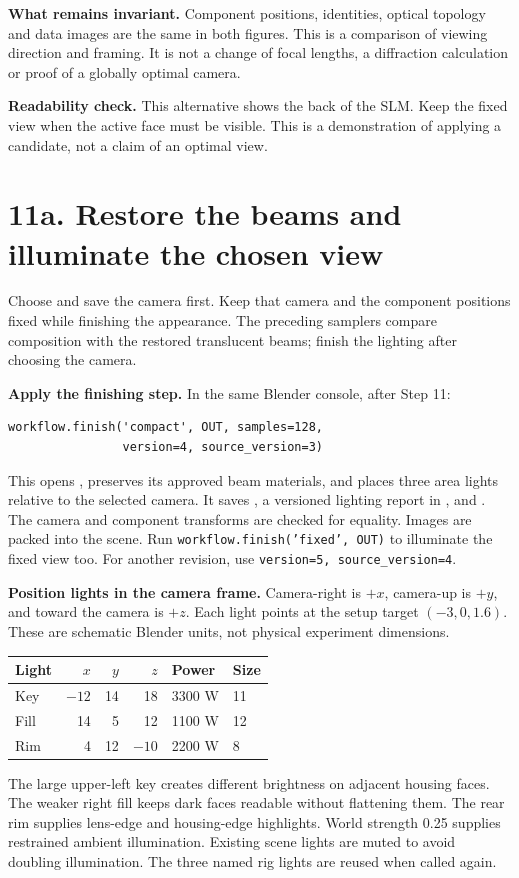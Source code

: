 \documentclass[11pt,a4paper]{article}
\begin{document}
\textbf{What remains invariant.} Component positions, identities, optical topology and data images are the same in both figures. This is a comparison of viewing direction and framing. It is not a change of focal lengths, a diffraction calculation or proof of a globally optimal camera.

\par\textbf{Readability check.} This alternative shows the back of the SLM. Keep the fixed view when the active face must be visible. This is a demonstration of applying a candidate, not a claim of an optimal view.
\clearpage
\section*{11a. Restore the beams and illuminate the chosen view}
Choose and save the camera first. Keep that camera and the component positions fixed while finishing the appearance. The preceding samplers compare composition with the restored translucent beams; finish the lighting after choosing the camera.

\textbf{Apply the finishing step.} In the same Blender console, after Step 11:
\begin{Verbatim}[fontsize=\small]
workflow.finish('compact', OUT, samples=128,
                version=4, source_version=3)
\end{Verbatim}
This opens , preserves its approved beam materials, and places three area lights relative to the selected camera. It saves , a versioned lighting report in , and . The camera and component transforms are checked for equality. Images are packed into the scene. Run \texttt{workflow.finish('fixed', OUT)} to illuminate the fixed view too. For another revision, use \texttt{version=5, source\_version=4}.

\textbf{Position lights in the camera frame.} Camera-right is $+x$, camera-up is $+y$, and toward the camera is $+z$. Each light points at the setup target $(-3,0,1.6)$. These are schematic Blender units, not physical experiment dimensions.
\begin{center}
\begin{tabular}{lrrrll}
Light & $x$ & $y$ & $z$ & Power & Size\\\hline
Key & $-12$ & 14 & 18 & 3300 W & 11\\
Fill & 14 & 5 & 12 & 1100 W & 12\\
Rim & 4 & 12 & $-10$ & 2200 W & 8
\end{tabular}
\end{center}
The large upper-left key creates different brightness on adjacent housing faces. The weaker right fill keeps dark faces readable without flattening them. The rear rim supplies lens-edge and housing-edge highlights. World strength 0.25 supplies restrained ambient illumination. Existing scene lights are muted to avoid doubling illumination. The three named rig lights are reused when called again.
\end{document}

